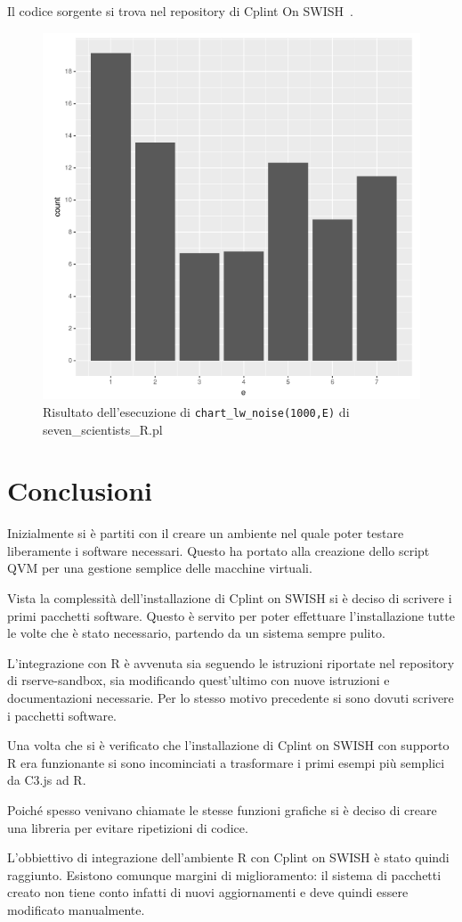 \documentclass[10pt,titlepage,twoside,a4paper]{report}
\begin{document}
Il codice sorgente si trova nel repository di Cplint On 
SWISH~\cite{sevenScientistsRpl}.

\begin{minipage}{\textwidth}
\begin{figure}[H]
\centering
\caption{Risultato dell'esecuzione di \texttt{chart\_lw\_noise(1000,E)} di seven\_scientists\_R.pl}
\label{fig:sevenScientistsRResult}
\includegraphics[width=.5\linewidth]{seven_scientists_R_plot.png}
\end{figure}
\end{minipage}



\chapter{Conclusioni}
Inizialmente si è partiti con il creare un ambiente nel quale poter testare 
liberamente i software necessari. Questo ha portato alla creazione dello 
script QVM per una gestione semplice delle macchine virtuali.

Vista la complessità dell'installazione di Cplint on SWISH si è 
deciso di scrivere i primi pacchetti software.
Questo è servito per poter effettuare l'installazione tutte le volte che è 
stato necessario, partendo da un sistema sempre pulito.

L'integrazione con R è avvenuta sia seguendo le istruzioni riportate nel 
repository di rserve-sandbox, sia modificando quest'ultimo con nuove istruzioni 
e documentazioni necessarie. Per lo stesso motivo precedente si sono dovuti 
scrivere i pacchetti software.

Una volta che si è verificato che l'installazione di Cplint on SWISH con 
supporto R era funzionante si sono incominciati a trasformare i primi esempi 
più semplici da C3.js ad R. 

Poiché spesso venivano chiamate le stesse funzioni grafiche si è deciso di 
creare una libreria per evitare ripetizioni di codice.

L'obbiettivo di integrazione dell'ambiente R con Cplint on SWISH è stato 
quindi raggiunto. Esistono comunque margini di miglioramento: il sistema di 
pacchetti creato non tiene conto infatti di nuovi aggiornamenti e deve quindi
essere modificato manualmente.




\printbibliography
\end{document}
